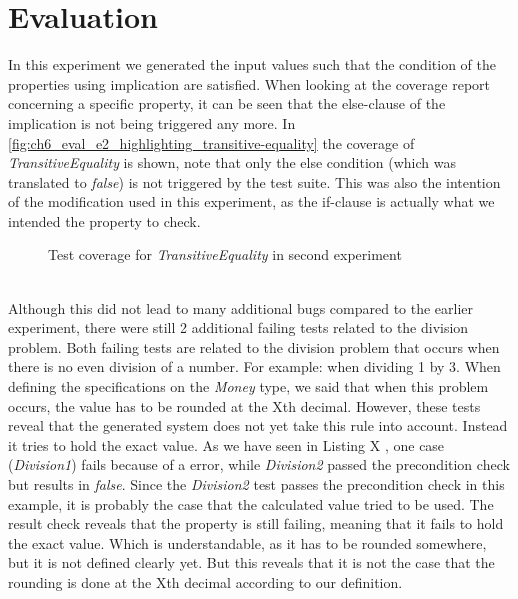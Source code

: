 \section{Evaluation}
In this experiment we generated the input values such that the condition of the properties using implication are satisfied. When looking at the coverage report concerning a specific property, it can be seen that the else-clause of the implication is not being triggered any more. In \autoref{fig:ch6_eval_e2_highlighting_transitive-equality} the coverage of \textit{TransitiveEquality} is shown, note that only the else condition (which was translated to \textit{false}) is not triggered by the test suite. This was also the intention of the modification used in this experiment, as the if-clause is actually what we intended the property to check.
\\
\begin{figure}[h!]
\caption{Test coverage for \textit{TransitiveEquality} in second experiment}
\label{fig:ch6_eval_e2_highlighting_transitive-equality}
\centering
\end{figure}
\\
Although this did not lead to many additional bugs compared to the earlier experiment, there were still 2 additional failing tests related to the division problem. Both failing tests are related to the division problem that occurs when there is no even division of a number. For example: when dividing 1 by 3. When defining the specifications on the \textit{Money} type, we said that when this problem occurs, the value has to be rounded at the Xth  decimal. However, these tests reveal that the generated system does not yet take this rule into account. Instead it tries to hold the exact value. As we have seen in Listing X , one case (\textit{Division1}) fails because of a  error, while \textit{Division2} passed the precondition check but results in \textit{false}. Since the \textit{Division2} test passes the precondition check in this example, it is probably the case that the calculated value tried to be used. The result check reveals that the property is still failing, meaning that it fails to hold the exact value. Which is understandable, as it has to be rounded somewhere, but it is not defined clearly yet. But this reveals that it is not the case that the rounding is done at the Xth  decimal according to our definition.

